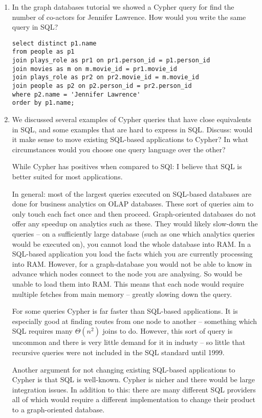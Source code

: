 \documentclass[10pt,\jkfside,a4paper]{article}
\begin{document}
\begin{enumerate}
\item{In the graph databases tutorial we showed a Cypher query for find the 
number of co-actors for Jennifer Lawrence. How would you write the same 
query in SQL?}

\begin{verbatim}
select distinct p1.name
from people as p1
join plays_role as pr1 on pr1.person_id = p1.person_id
join movies as m on m.movie_id = pr1.movie_id
join plays_role as pr2 on pr2.movie_id = m.movie_id
join people as p2 on p2.person_id = pr2.person_id
where p2.name = 'Jennifer Lawrence'
order by p1.name;
\end{verbatim}

\item{We discussed several examples of Cypher queries that have close 
equivalents in SQL, and some examples that are hard to express in SQL. 
Discuss: would it make sense to move existing SQL-based applications to 
Cypher? In what circumstances would you choose one query language over the 
other?}

While Cypher has positives when compared to SQl: I believe that 
SQL is better suited for most applications. 

In general: most of the largest queries executed on SQL-based databases are done 
for business analytics on OLAP databases. These sort of queries aim to only touch 
each fact once and then proceed. Graph-oriented databases do not offer any speedup 
on analytics such as these. They would likely slow-down the queries -- 
on a sufficiently large database (such as one which analytics queries 
would be executed on), you cannot load the whole database into RAM. In a SQL-based 
application you load the facts which you are currently processing into RAM.
However, for a graph-database you would not be able to know in advance which 
nodes connect to the node you are analysing. So would be unable to load them into RAM. 
This means that each node would require multiple fetches from main memory -- greatly slowing 
down the query.

For some queries Cypher is far faster than SQL-based applications. 
It is especially good at finding routes from one node to another -- something which 
SQL requires many $\Theta(n^2)$ joins to do. However, this sort of query is uncommon 
and there is very little demand for it in industy -- so little that recursive queries were 
not included in the SQL standard until 1999.

Another argument for not changing existing SQL-based applications to Cypher is 
that SQL is well-known. Cypher is nicher and there would be large integration issues. 
In addition to this: there are many different SQL providers all of which would 
require a different implementation to change their product to a graph-oriented database.


\end{enumerate}
\end{document}
